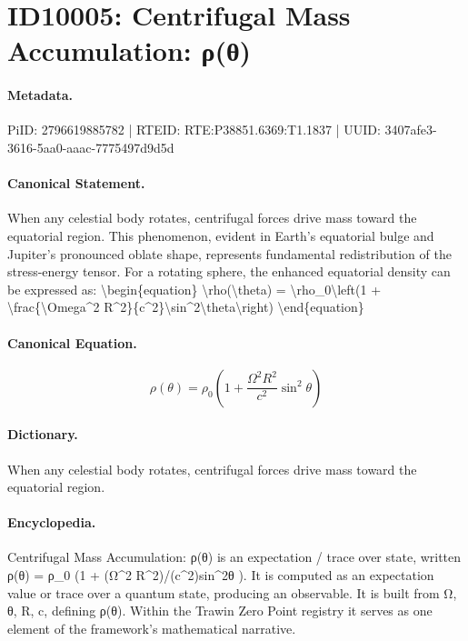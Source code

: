 \section*{ID10005: Centrifugal Mass Accumulation: ρ(θ)}
\paragraph{Metadata.}
PiID: 2796619885782 | RTEID: RTE:P38851.6369:T1.1837 | UUID: 3407afe3-3616-5aa0-aaac-7775497d9d5d

\paragraph{Canonical Statement.}
When any celestial body rotates, centrifugal forces drive mass toward the equatorial region. This phenomenon, evident in Earth's equatorial bulge and Jupiter's pronounced oblate shape, represents fundamental redistribution of the stress-energy tensor. For a rotating sphere, the enhanced equatorial density can be expressed as: \textbackslash{}begin\{equation\} \textbackslash{}rho(\textbackslash{}theta) = \textbackslash{}rho\_0\textbackslash{}left(1 + \textbackslash{}frac\{\textbackslash{}Omega\textasciicircum{}2 R\textasciicircum{}2\}\{c\textasciicircum{}2\}\textbackslash{}sin\textasciicircum{}2\textbackslash{}theta\textbackslash{}right) \textbackslash{}end\{equation\}

\paragraph{Canonical Equation.}
\[
\rho(\theta) = \rho_0\left(1 + \frac{\Omega^2 R^2}{c^2}\sin^2\theta\right)
\]

\paragraph{Dictionary.}
When any celestial body rotates, centrifugal forces drive mass toward the equatorial region.

\paragraph{Encyclopedia.}
Centrifugal Mass Accumulation: ρ(θ) is an expectation / trace over state, written ρ(θ) = ρ\_0 (1 + (Ω\textasciicircum{}2 R\textasciicircum{}2)/(c\textasciicircum{}2)sin\textasciicircum{}2θ ). It is computed as an expectation value or trace over a quantum state, producing an observable. It is built from Ω, θ, R, c, defining ρ(θ). Within the Trawin Zero Point registry it serves as one element of the framework's mathematical narrative.
